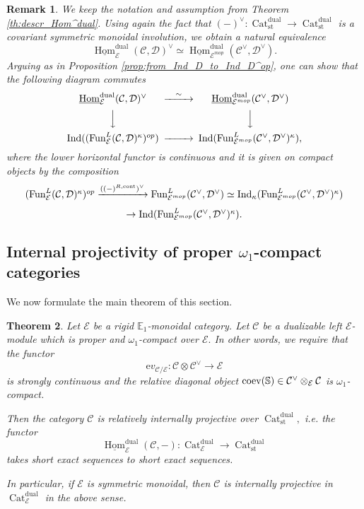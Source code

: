 \documentclass[11pt,leqno]{amsart}
\newtheorem{theo}{Theorem}[section]
\newtheorem{remark}[theo]{Remark}
\numberwithin{equation}{section}
\def\bS{\mathbb{S}}
\def\Hom{\operatorname{Hom}}
\newcommand{\tens}[1]{%
  \mathbin{\mathop{\otimes}\displaylimits_{#1}}%
}
\newcommand{\xto}{\xrightarrow}
\newcommand{\Cat}{\operatorname{Cat}}
\newcommand{\cont}{\operatorname{cont}}
\newcommand{\st}{\operatorname{st}}
\newcommand{\dual}{\operatorname{dual}}
\newcommand{\bE}{{\mathbb E}}
\newcommand{\ev}{\mathrm ev}
\newcommand{\cD}{{\mathcal D}}
\newcommand{\cC}{{\mathcal C}}
\newcommand{\cE}{{\mathcal E}}
\newcommand{\un}{\underline}
\newcommand{\Fun}{\operatorname{Fun}}
\newcommand{\Ind}{\operatorname{Ind}}
\newcommand{\coev}{\operatorname{coev}}
\begin{document}
\begin{remark}
We keep the notation and assumption from Theorem \ref{th:descr_Hom^dual}. Using again the fact that $(-)^{\vee}:\Cat_{\st}^{\dual}\to \Cat_{\st}^{\dual}$ is a covariant symmetric monoidal involution, we obtain a natural equivalence
\begin{equation*}
\un{\Hom}_{\cE}^{\dual}(\cC,\cD)^{\vee}\simeq \un{\Hom}_{\cE^{mop}}^{\dual}(\cC^{\vee},\cD^{\vee}).
\end{equation*}
Arguing as in Proposition \ref{prop:from_Ind_D_to_Ind_D^op}, one can show that the following diagram commutes
\begin{equation*}
\begin{CD}
\un{\Hom}_{\cE}^{\dual}(\cC,\cD)^{\vee} @>{\sim}>> \un{\Hom}_{\cE^{mop}}^{\dual}(\cC^{\vee},\cD^{\vee})\\
@VVV @VVV\\
\Ind((\Fun_{\cE}^L(\cC,\cD)^{\kappa})^{op}) @>>> \Ind(\Fun_{\cE^{mop}}^L(\cC^{\vee},\cD^{\vee})^{\kappa}),
\end{CD}
\end{equation*}
where the lower horizontal functor is continuous and it is given on compact objects by the composition
\begin{multline*}
\begin{CD}
(\Fun_{\cE}^L(\cC,\cD)^{\kappa})^{op}\xto{((-)^{R,\cont})^{\vee}}\Fun^L_{\cE^{mop}}(\cC^{\vee},\cD^{\vee})\simeq\Ind_{\kappa}(\Fun_{\cE^{mop}}^L(\cC^{\vee},\cD^{\vee})^{\kappa})\\
\to \Ind(\Fun_{\cE^{mop}}^L(\cC^{\vee},\cD^{\vee})^{\kappa}).
\end{CD}
\end{multline*}
\end{remark}

\subsection{Internal projectivity of proper $\omega_1$-compact categories}

We now formulate the main theorem of this section.

\begin{theo}\label{th:internal_projectivity} Let $\cE$ be a rigid $\bE_1$-monoidal category. Let $\cC$ be a dualizable left $\cE$-module which is proper and $\omega_1$-compact over $\cE.$ In other words, we require that the functor $$\ev_{\cC/\cE}:\cC\otimes\cC^{\vee}\to \cE$$ is strongly continuous and the relative diagonal object $\coev(\bS)\in \cC^{\vee}\tens{\cE}\cC$ is $\omega_1$-compact.
	
Then the category $\cC$ is relatively internally projective over $\Cat_{\st}^{\dual},$ i.e. the functor
$$\un{\Hom}_{\cE}^{\dual}(\cC,-):\Cat_{\cE}^{\dual}\to\Cat_{\st}^{\dual}$$ takes short exact sequences to short exact sequences.

In particular, if $\cE$ is symmetric monoidal, then $\cC$ is internally projective in $\Cat_{\cE}^{\dual}$ in the above sense.
\end{theo}
\end{document}
